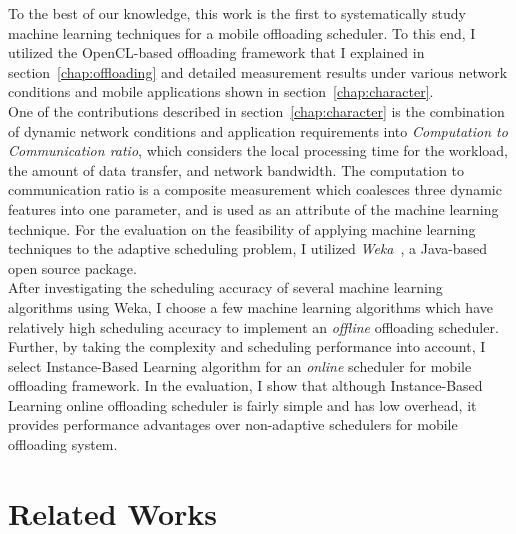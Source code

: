 %
To the best of our knowledge, this work is the first to systematically
study machine learning techniques for a mobile offloading scheduler.
%
To this end, I utilized the OpenCL-based offloading framework that I
explained in section~\ref{chap:offloading} and detailed measurement results
under various network conditions and mobile applications shown in
section~\ref{chap:character}.\\
%
One of the contributions described in section~\ref{chap:character} is
the combination of dynamic network conditions and application
requirements into {\it Computation to Communication ratio}, which considers
the local processing time for the workload, the amount of data transfer,
and network bandwidth.
%
The computation to communication ratio is a composite measurement which
coalesces three dynamic features into one parameter, and is used as an
attribute of the machine learning technique.
%
For the evaluation on the feasibility of applying machine learning
techniques to the adaptive scheduling problem, I utilized
{\it Weka}~\cite{weka}, a Java-based open source package.\\
%
After investigating the scheduling accuracy of several machine learning
algorithms using Weka, I choose a few machine learning algorithms which
have relatively high scheduling accuracy to implement an {\it offline}
offloading scheduler.
%
Further, by taking the complexity and scheduling performance into
account, I select Instance-Based Learning algorithm for an {\it online}
scheduler for mobile offloading framework.
%
In the evaluation, I show that although Instance-Based Learning online
offloading scheduler is fairly simple and has low overhead, it provides
performance advantages over non-adaptive schedulers for mobile
offloading system.
 
\section{Related Works}
\label{scheduler:relatedwork}
%
